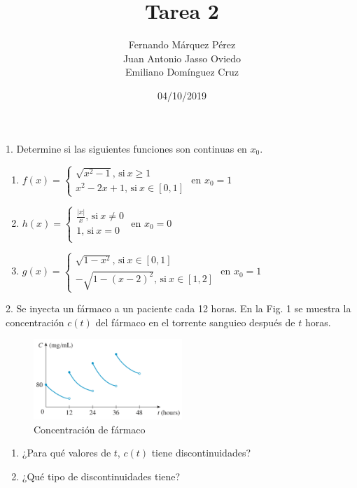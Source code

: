 \documentclass[12pt]{article}
\title{Tarea 2}
\author{Fernando Márquez Pérez \\ Juan Antonio Jasso Oviedo \\ Emiliano Dom\'inguez Cruz}
\date{04/10/2019}
\affil{Facultad de Ciencias\\UNAM}
\begin{document}
\begin{titlepage}
    \maketitle
\end{titlepage}

1. Determine si las siguientes funciones son continuas en \(x_0\).

\begin{enumerate}[\hspace{9px} a)]
    \item
    \( f(x)=
    \begin{cases}
        \sqrt{x^2-1}\text{, si} \ x \geq 1\\
        x^2-2x+1\text{, si} \ x \in [0,1]
    \end{cases}
    \)
    en $x_0 = 1$\\
    \item
    \( h(x)=
    \begin{cases}
        \frac{|x|}{x}\text{, si} \ x \neq 0\\
        1\text{, si} \ x=0\\
    \end{cases}
    \)
    en $x_0=0$
    \item
    \( g(x)=
    \begin{cases}
        \sqrt{1-x^2}\text{, si} \ x \in [0,1]\\
        -\sqrt{1-(x-2)^2}\text{, si} \ x \in [1,2]
    \end{cases}
    \)
    en $x_0=1$
\end{enumerate}

2. Se inyecta un fármaco a un paciente cada 12 horas. En la Fig. 1 se muestra la concentración $c(t)$ del fármaco en el torrente sanguieo después de $t$ horas.
\begin{figure}[h]
    \centering
    \includegraphics[width=0.5\textwidth]{fig1}
    \caption{Concentraci\'on de f\'armaco}
    \label{fig1}
\end{figure}
\begin{enumerate}[\hspace{9px} a)]
    \item ¿Para qué valores de $t$, $c(t)$ tiene discontinuidades?
    \item ¿Qué tipo de discontinuidades tiene?
\end{enumerate}
\end{document}
